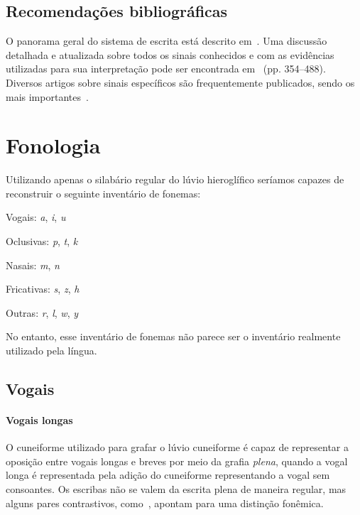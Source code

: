 \subsection{Recomendações bibliográficas}

O panorama geral do sistema de escrita está descrito
em~\citet[p. 155ff.]{HawkinsScripts}.
Uma discussão detalhada e atualizada sobre todos os sinais conhecidos e com
as evidências utilizadas para sua interpretação pode ser encontrada
em~ (pp. 354--488).
Diversos artigos sobre sinais específicos são frequentemente publicados, sendo
os mais
importantes~\citet{HawkinsMorpurgoNeumann1974,Rieken2008,RiekenYakubovich2010}.

\section{Fonologia}

Utilizando apenas o silabário regular do lúvio hieroglífico seríamos capazes de
reconstruir o seguinte inventário de fonemas:

\begin{compactitem}
	\item Vogais: \emph{a}, \emph{i}, \emph{u}
	\item Oclusivas: \emph{p}, \emph{t}, \emph{k}
	\item Nasais: \emph{m}, \emph{n}
	\item Fricativas: \emph{s}, \emph{z}, \emph{h}
	\item Outras: \emph{r}, \emph{l}, \emph{w}, \emph{y}
\end{compactitem}
No entanto, esse inventário de fonemas não parece ser o inventário realmente
utilizado pela língua.

\subsection{Vogais}

\paragraph{Vogais longas}
O cuneiforme utilizado para grafar o lúvio cuneiforme é capaz de representar
a oposição entre vogais longas e
breves por meio da grafia \emph{plena}, quando a vogal longa é representada pela
adição do cuneiforme representando a vogal sem consoantes.
Os escribas não se valem da escrita plena de maneira regular, mas alguns pares
contrastivos, como~\Next, apontam para uma distinção fonêmica.

